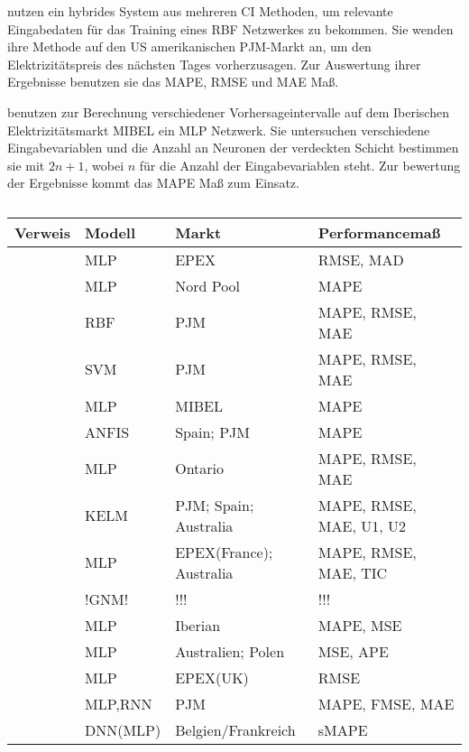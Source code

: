 \citet{Jiang2016} nutzen ein hybrides System aus mehreren CI Methoden, um relevante Eingabedaten für das Training eines RBF Netzwerkes zu bekommen. Sie wenden ihre Methode auf den US amerikanischen PJM-Markt an, um den Elektrizitätspreis des nächsten Tages vorherzusagen. Zur Auswertung ihrer Ergebnisse benutzen sie das MAPE, RMSE und MAE Maß.

\citet{Monteiro2016} benutzen zur Berechnung verschiedener Vorhersageintervalle auf dem Iberischen Elektrizitätsmarkt MIBEL ein MLP Netzwerk. Sie untersuchen verschiedene Eingabevariablen und die Anzahl an Neuronen der verdeckten Schicht bestimmen sie mit $2n+1$, wobei $n$ für die Anzahl der Eingabevariablen steht. Zur bewertung der Ergebnisse kommt das MAPE Maß zum Einsatz.

\begin{table}[h]
\label{tab:ann_lit}
\caption{}
\begin{tabularx}{\textwidth}{llZZ}
\toprule
Verweis                 &  Modell   & Markt                     & Performancemaß            \\
\midrule
\citet{Keles2016}       & MLP       & EPEX                      & RMSE, MAD                 \\
\citet{Bobinaite2016}   & MLP       & Nord Pool                 & MAPE                      \\
\citet{Jiang2016}       & RBF       & PJM                       & MAPE, RMSE, MAE           \\
\citet{Feijoo2016}      & SVM       & PJM                       & MAPE, RMSE, MAE           \\
\citet{Monteiro2016}    & MLP       & MIBEL                     & MAPE                      \\
\citet{Osorio2016}      & ANFIS     & Spain; PJM                & MAPE                      \\
\citet{Sandhu2016}      & MLP       & Ontario                   & MAPE, RMSE, MAE           \\
\citet{Yang2017}        & KELM      & PJM; Spain; Australia     & MAPE, RMSE, MAE, U1, U2   \\
\citet{Wang2017}        & MLP       & EPEX(France); Australia   & MAPE, RMSE, MAE, TIC      \\
\citet{Singh2017}       & !GNM!       & !!!   & !!!      \\

\citet{Marcos2017}      & MLP       & Iberian                   & MAPE, MSE                 \\
\citet{Domanski2017}    & MLP       & Australien; Polen         & MSE, APE                  \\
\citet{Gao2017}         & MLP       & EPEX(UK)                  & RMSE                      \\
\citet{Mandal2017}      & MLP,RNN   & PJM                       & MAPE, FMSE, MAE           \\
\citet{Lago2018}        & DNN(MLP)  & Belgien/Frankreich        & sMAPE                     \\


\bottomrule
\end{tabularx}
\end{table}
